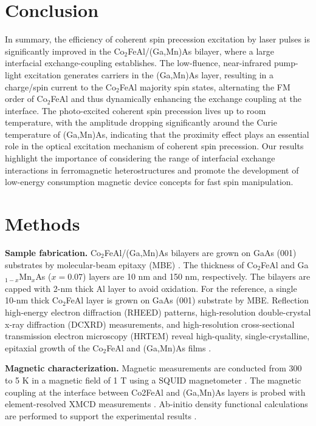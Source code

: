 \documentclass[%
 reprint,
superscriptaddress,
 amsmath,amssymb,
 aps,
prl,
]{revtex4-1}
\begin{document}
\section{\label{sec:Conclusion}Conclusion}

In summary, the efficiency of coherent spin precession excitation by laser pulses is significantly improved in the Co$_{2}$FeAl/(Ga,Mn)As bilayer, where a large interfacial exchange-coupling establishes. The low-fluence, near-infrared pump-light excitation generates carriers in the (Ga,Mn)As layer, resulting in a charge/spin current to the Co$_{2}$FeAl majority spin states, alternating the FM order of Co$_{2}$FeAl and thus dynamically enhancing the exchange coupling at the interface. The photo-excited coherent spin precession lives up to room temperature, with the amplitude dropping significantly around the Curie temperature of (Ga,Mn)As, indicating that the proximity effect plays an essential role in the optical excitation mechanism of coherent spin precession. Our results highlight the importance of considering the range of interfacial exchange interactions in ferromagnetic heterostructures and promote the development of low-energy consumption magnetic device concepts for fast spin manipulation.

\section{\label{sec:Methods}Methods}

\textbf{Sample fabrication.} Co$_{2}$FeAl/(Ga,Mn)As bilayers are grown on GaAs (001) substrates by molecular-beam epitaxy (MBE) \cite{24}. The thickness of Co$_{2}$FeAl and Ga$_{1-x}$Mn$_{x}$As ($x=0.07$) layers are 10 nm and 150 nm, respectively. The bilayers are capped with 2-nm thick Al layer to avoid oxidation. For the reference, a single 10-nm thick Co$_{2}$FeAl layer is grown on GaAs (001) substrate by MBE. Reflection high-energy electron diffraction (RHEED) patterns, high-resolution double-crystal x-ray diffraction (DCXRD) measurements, and high-resolution cross-sectional transmission electron microscopy (HRTEM) reveal high-quality, single-crystalline, epitaxial growth of the Co$_{2}$FeAl and (Ga,Mn)As films \cite{24}.

\textbf{Magnetic characterization.} Magnetic measurements are conducted from 300 to 5 K in a magnetic field of 1 T using a SQUID magnetometer \cite{24}. The magnetic coupling at the interface between Co2FeAl and (Ga,Mn)As layers is probed with element-resolved XMCD measurements \cite{24}. Ab-initio density functional calculations are performed to support the experimental results \cite{24}.
\end{document}
